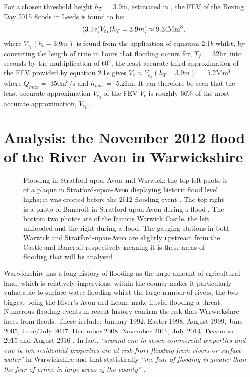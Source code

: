 \documentclass[11pt,a4paper]{article}
\begin{document}
For a chosen threshold height $h_T=$ 3.9m, estimated in \cite{Aire}, the FEV of the Boxing Day 2015 floods in Leeds is found to be:
\begin{equation}\tag{3.1\textit{e}}
V_{e_1}(h_T=3.9m)\approx 9.34\text{Mm}^3,
\end{equation}
where $V_{e_1}(h_t=3.9m)$ is found from the application of equation 2.1\textit{b} whilst, by converting the length of time in hours that flooding occurs for, $T_f=$ 32hr, into seconds by the multiplication of 60$^2$, the least accurate third approximation of the FEV provided by equation 2.1\textit{e} gives $V_e\approx V_{e_3}(h_T=3.9m)=$ 6.2Mm$^3$ where $Q_{max}=$ 350m$^3$/s and $h_{max}=$ 5.21m. It can therefore be seen that the least accurate approximation $V_{e_3}$ of the FEV $V_e$ is roughly 66\% of the most accurate approximation, $V_{e_1}$.

\section{Analysis: the November 2012 flood of the River Avon in Warwickshire}
\begin{figure}[ht!]
\centering
{}
\hfill
{}
\caption{Flooding in Stratford-upon-Avon and Warwick: the top left photo is of a plaque in Stratford-upon-Avon displaying historic flood level highs{;} it was erected before the 2012 flooding event \cite{plaque}. The top right is a photo of Bancroft in Stratford-upon-Avon during a flood \cite{strat-flood}. The bottom two photos are of the famous Warwick Castle, the left \cite{castle} unflooded and the right \cite{warwick-flooding} during a flood. The gauging stations in both Warwick and Stratford-upon-Avon are slightly upstream from the Castle and Bancroft respectively meaning it is these areas of flooding that will be analysed.}
\end{figure}

Warwickshire has a long history of flooding as the large amount of agricultural land, which is relatively impervious, within the county makes it particularly vulnerable to surface water flooding whilst the large number of rivers, the two biggest being the River's Avon and Leam, make fluvial flooding a threat. Numerous flooding events in recent history confirm the risk that Warwickshire faces from floods. These include: January 1992, Easter 1998, August 1999, June 2005, June/July 2007, December 2008, November 2012, July 2014, December 2015 and August 2016 \cite{war2}. In fact, \textit{``around one in seven commercial properties and one in ten residential properties are at risk from flooding from rivers or surface water''} \cite{war1} in Warwickshire and that statistically \textit{``the fear of flooding is greater than the fear of crime in large areas of the county''} \cite{war1}. 
\end{document}
